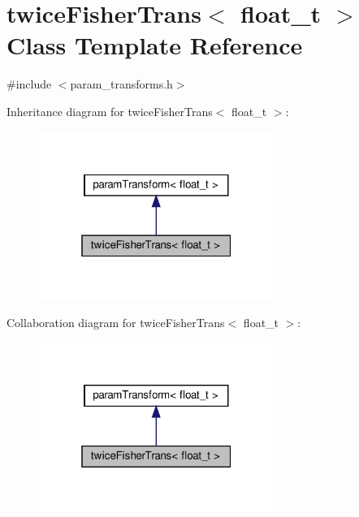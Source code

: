 \hypertarget{classtwiceFisherTrans}{}\section{twice\+Fisher\+Trans$<$ float\+\_\+t $>$ Class Template Reference}
\label{classtwiceFisherTrans}


{\ttfamily \#include $<$param\+\_\+transforms.\+h$>$}



Inheritance diagram for twice\+Fisher\+Trans$<$ float\+\_\+t $>$\+:
\nopagebreak
\begin{figure}[H]
\begin{center}
\leavevmode
\includegraphics[width=217pt]{classtwiceFisherTrans__inherit__graph}
\end{center}
\end{figure}


Collaboration diagram for twice\+Fisher\+Trans$<$ float\+\_\+t $>$\+:
\nopagebreak
\begin{figure}[H]
\begin{center}
\leavevmode
\includegraphics[width=217pt]{classtwiceFisherTrans__coll__graph}
\end{center}
\end{figure}
